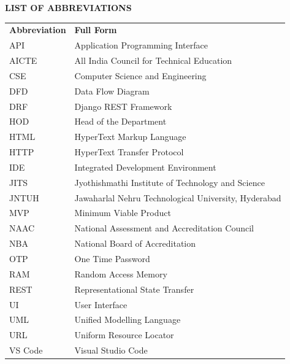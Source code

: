 \documentclass[12pt,a4paper,oneside]{report}
\numberwithin{figure}{chapter}
\numberwithin{table}{chapter}
\begin{document}
\newpage
\thispagestyle{plain}
{\setlength{\parskip}{0pt}
\listoftables}

\newpage
\thispagestyle{plain}
\begin{center}
  {\fontsize{16}{20}\selectfont\bfseries LIST OF ABBREVIATIONS}
\end{center}
\vspace{2\baselineskip}

\begin{tabular}{p{} p{}}
  \textbf{Abbreviation} & \textbf{Full Form} \\[0.5cm]
  API      & Application Programming Interface \\
  AICTE    & All India Council for Technical Education \\
  CSE      & Computer Science and Engineering \\
  DFD      & Data Flow Diagram \\
  DRF      & Django REST Framework \\
  HOD      & Head of the Department \\
  HTML     & HyperText Markup Language \\
  HTTP     & HyperText Transfer Protocol \\
  IDE      & Integrated Development Environment \\
  JITS     & Jyothishmathi Institute of Technology and Science \\
  JNTUH    & Jawaharlal Nehru Technological University, Hyderabad \\
  MVP      & Minimum Viable Product \\
  NAAC     & National Assessment and Accreditation Council \\
  NBA      & National Board of Accreditation \\
  OTP      & One Time Password \\
  RAM      & Random Access Memory \\
  REST     & Representational State Transfer \\
  UI       & User Interface \\
  UML      & Unified Modelling Language \\
  URL      & Uniform Resource Locator \\
  VS Code  & Visual Studio Code \\
\end{tabular}
\end{document}
